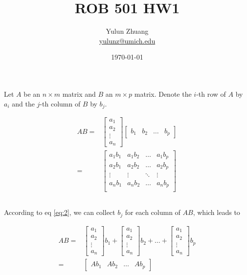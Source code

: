 \documentclass{article}
\title{ROB 501 HW1}
\author{Yulun Zhuang \\ \href{mailto:yulunz@umich.edu}{yulunz@umich.edu}}
\date{\today}
\begin{document}
\maketitle

\section{}

Let $A$ be an $n \times m$ matrix and $B$ an $m \times p$ matrix. Denote the $i$-th row of $A$ by $a_i$ and the $j$-th column of $B$ by $b_j$.

\begin{align}
    AB = &
    \begin{bmatrix}
        a_1\\a_2\\\vdots\\a_n
    \end{bmatrix}
    \begin{bmatrix}
        b_1 & b_2 & \dots &b_p
    \end{bmatrix}\\
    = &
    \begin{bmatrix}
        a_1b_1 & a_1b_2 & \dots & a_1b_p\\
        a_2b_1 & a_2b_2 & \dots & a_2b_p \\
        \vdots & \vdots & \ddots& \vdots\\
        a_nb_1 & a_nb_2 & \dots & a_nb_p\\
    \end{bmatrix}\label{eq:2}
\end{align}

\subsection{}
According to eq \eqref{eq:2}, we can collect $b_j$ for each column of $AB$, which leads to

\begin{align*}
    AB = &
    \begin{bmatrix}
        a_1\\a_2\\\vdots\\a_n
    \end{bmatrix}
    b_1
    +
    \begin{bmatrix}
        a_1\\a_2\\\vdots\\a_n
    \end{bmatrix}
    b_2
    +
    \dots
    +
    \begin{bmatrix}
        a_1\\a_2\\\vdots\\a_n
    \end{bmatrix}
    b_p\\
    = &
    \begin{bmatrix}
        Ab_1 & Ab_2 & \dots & Ab_p
    \end{bmatrix}
\end{align*}
\end{document}
